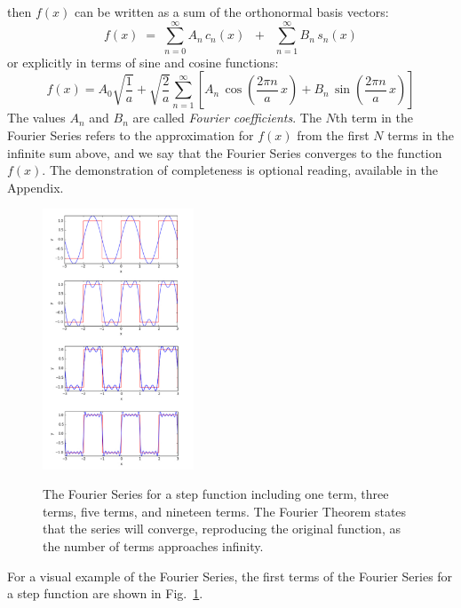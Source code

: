 \documentclass[12pt]{book}
\begin{document}
then $f(x)$ can be written as a sum of the orthonormal basis vectors:
\begin{equation}
f(x) \; = \; \sum_{n=0}^{\infty}  A_n \, c_n(x)  \; \; + \; \; \sum_{n=1}^{\infty} B_n \, s_n(x) \label{eqn:bfs}
\end{equation}
or explicitly in terms of sine and cosine functions:
\begin{equation}
f(x) = A_0 \sqrt{\frac{1}{a}} + \sqrt{\frac{2}{a}} \sum_{n=1}^{\infty}  \left[ A_n \, \cos\left(\frac{2\pi n}{a} \, x \right) + B_n \, \sin\left(\frac{2\pi n}{a} \, x \right)\right]\label{eqn :lfs}
\end{equation}
The values $A_n$ and $B_n$ are called {\em Fourier coefficients}.  The $N$th term in the Fourier Series refers to the approximation for $f(x)$ from the first $N$ terms in the infinite sum above, and we say that the Fourier Series converges to the function $f(x)$.  The demonstration of completeness is optional reading, available in the Appendix.

\begin{figure}[thb]
\begin{center}
{\includegraphics[width=0.40\textwidth]{figs/fsall.pdf}}
\end{center}
\caption{\label{fig:fall} The Fourier Series for a step function including one term, three terms, five terms, and nineteen terms.  The Fourier Theorem states that the series will converge, reproducing the original function, as the number of terms approaches infinity.}
\end{figure}

For a visual example of the Fourier Series, the first terms of the Fourier Series for a step function are shown in Fig.~\ref{fig:fall}.  
\end{document}
